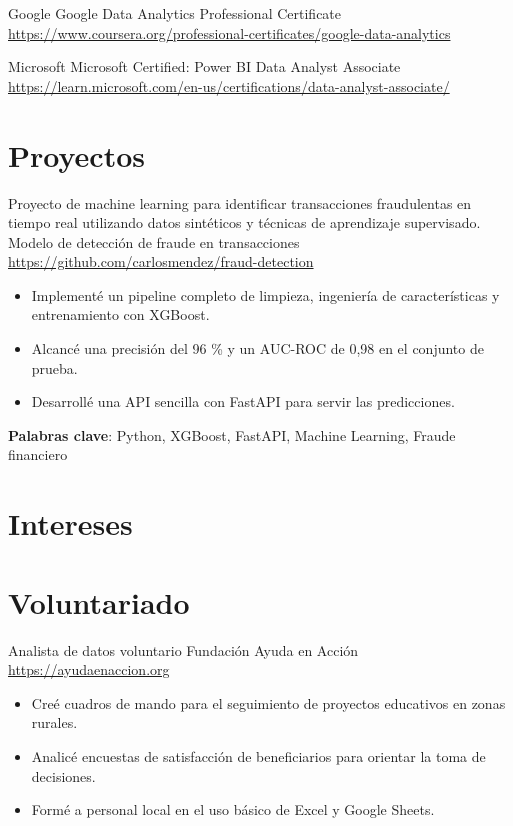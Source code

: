 \documentclass[a4paper, serif, 10pt]{moderncv}
\begin{document}
        {Google}
        {Google Data Analytics Professional Certificate}
        {\url{https://www.coursera.org/professional-certificates/google-data-analytics}}
        {}
        {}

        {Microsoft}
        {Microsoft Certified: Power BI Data Analyst Associate}
        {\url{https://learn.microsoft.com/en-us/certifications/data-analyst-associate/}}
        {}
        {}
\section{Proyectos}

        {Proyecto de machine learning para identificar transacciones fraudulentas en tiempo real utilizando datos sintéticos y técnicas de aprendizaje supervisado.}
        {Modelo de detección de fraude en transacciones}
        {\url{https://github.com/carlosmendez/fraud-detection}}
        {}
        {\begin{itemize}
\item Implementé un pipeline completo de limpieza, ingeniería de características y entrenamiento con XGBoost.
\item Alcancé una precisión del 96 \% y un AUC-ROC de 0,98 en el conjunto de prueba.
\item Desarrollé una API sencilla con FastAPI para servir las predicciones.
\end{itemize}
\textbf{Palabras clave}: Python, XGBoost, FastAPI, Machine Learning, Fraude financiero}
\section{Intereses}

\section{Voluntariado}

        {Analista de datos voluntario}
        {Fundación Ayuda en Acción}
        {\url{https://ayudaenaccion.org}}
        {}
        {\begin{itemize}
\item Creé cuadros de mando para el seguimiento de proyectos educativos en zonas rurales.
\item Analicé encuestas de satisfacción de beneficiarios para orientar la toma de decisiones.
\item Formé a personal local en el uso básico de Excel y Google Sheets.
\end{itemize}}
    
\end{document}
